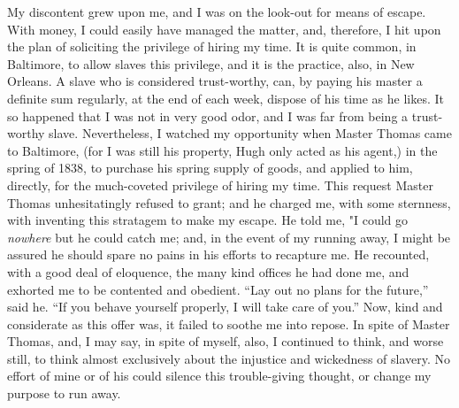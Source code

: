 My discontent grew upon me, and I was on the look-out for means of
escape. With money, I could easily have managed the matter, and,
therefore, I hit upon the plan of soliciting the privilege of hiring my
time. It is quite common, in Baltimore, to allow slaves this privilege,
and it is the practice, also, in New Orleans. A slave who is considered
{}trust-worthy, can, by paying his master a definite sum regularly, at
the end of each week, dispose of his time as he likes. It so happened
that I was not in very good odor, and I was far from being a
trust-worthy slave. Nevertheless, I watched my opportunity when Master
Thomas came to Baltimore, (for I was still his property, Hugh only acted
as his agent,) in the spring of 1838, to purchase his spring supply of
goods, and applied to him, directly, for the much-coveted privilege of
hiring my time. This request Master Thomas unhesitatingly refused to
grant; and he charged me, with some sternness, with inventing this
stratagem to make my escape. He told me, "I could go \emph{nowhere} but
he could catch me; and, in the event of my running away, I might be
assured he should spare no pains in his efforts to recapture me. He
recounted, with a good deal of eloquence, the many kind offices he had
done me, and exhorted me to be contented and obedient. ``Lay out no
plans for the future,'' said he. ``If you behave yourself properly, I
will take care of you.'' Now, kind and considerate as this offer was, it
failed to soothe me into repose. In spite of Master Thomas, and, I may
say, in spite of myself, also, I continued to think, and worse still, to
think almost exclusively about the injustice and wickedness of slavery.
No effort of mine or of his could silence this trouble-giving thought,
or change my purpose to run away.

